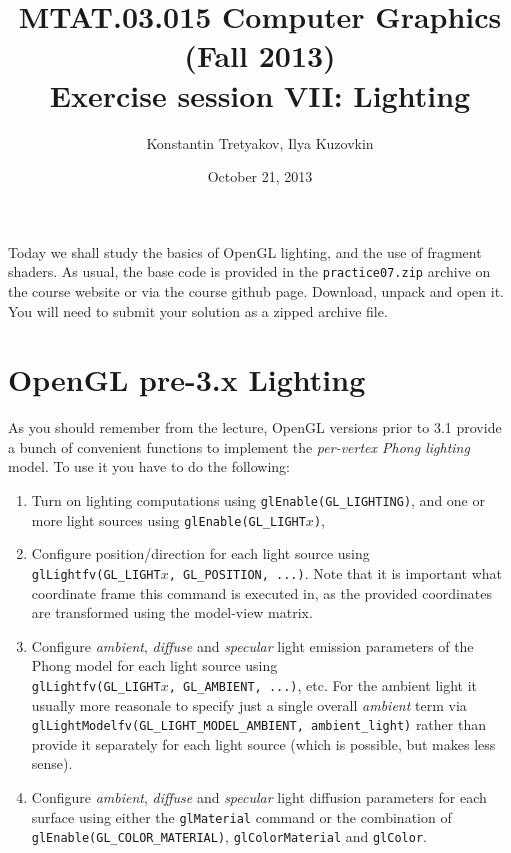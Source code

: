 \documentclass{article}
\begin{document}
\title{MTAT.03.015 Computer Graphics (Fall 2013)\\
Exercise session VII: Lighting}
\author{Konstantin Tretyakov, Ilya Kuzovkin}
\date{October 21, 2013}
\maketitle

Today we shall study the basics of OpenGL lighting, and the use of fragment shaders. As usual, the base code is provided in the \texttt{practice07.zip} archive on the course website or via the course github page. Download, unpack and open it. You will need to submit your solution as a zipped archive file.

\section{OpenGL pre-3.x Lighting}
As you should remember from the lecture, OpenGL versions prior to 3.1 provide a bunch of convenient functions to implement the \emph{per-vertex Phong lighting} model.
To use it you have to do the following:
\begin{enumerate}
\item Turn on lighting computations using \verb#glEnable(GL_LIGHTING)#, and one or more light sources using \verb#glEnable(GL_LIGHT#$x$\verb#)#,
\item Configure position/direction for each light source using\\ \verb#glLightfv(GL_LIGHT#$x$\verb#, GL_POSITION, ...)#. Note that it is important what coordinate frame this command is executed in, as the provided coordinates are transformed using the model-view matrix.
\item Configure \emph{ambient}, \emph{diffuse} and \emph{specular} light emission parameters of the Phong model for each light source using\\
\verb#glLightfv(GL_LIGHT#$x$\verb#, GL_AMBIENT, ...)#, etc.
For the ambient light it usually more reasonale to specify just a single overall \emph{ambient} term via \\
\verb#glLightModelfv(GL_LIGHT_MODEL_AMBIENT, ambient_light)# rather than provide it separately for each light source (which is possible, but makes less sense).
\item Configure \emph{ambient}, \emph{diffuse} and \emph{specular} light diffusion parameters for each surface using either the \verb#glMaterial# command or the combination of \verb#glEnable(GL_COLOR_MATERIAL)#, \verb#glColorMaterial# and \verb#glColor#.
\end{enumerate}
\end{document}
